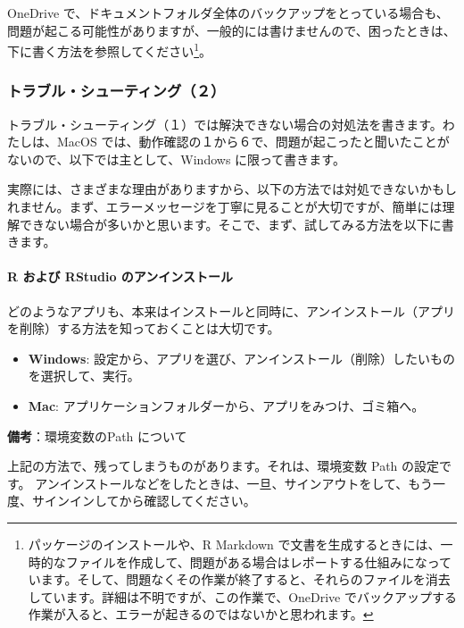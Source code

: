 \documentclass[
  xelatex, ja=standard]{bxjsbook}
\providecommand{\tightlist}{%
  \setlength{\itemsep}{0pt}\setlength{\parskip}{0pt}}
\theoremstyle{definition}
\theoremstyle{definition}
\theoremstyle{definition}
\theoremstyle{definition}
\theoremstyle{remark}
\begin{document}
OneDrive で、ドキュメントフォルダ全体のバックアップをとっている場合も、問題が起こる可能性がありますが、一般的には書けませんので、困ったときは、下に書く方法を参照してください\footnote{パッケージのインストールや、R Markdown で文書を生成するときには、一時的なファイルを作成して、問題がある場合はレポートする仕組みになっています。そして、問題なくその作業が終了すると、それらのファイルを消去しています。詳細は不明ですが、この作業で、OneDrive でバックアップする作業が入ると、エラーが起きるのではないかと思われます。}。

\hypertarget{ux30c8ux30e9ux30d6ux30ebux30b7ux30e5ux30fcux30c6ux30a3ux30f3ux30b0uxff12}{%
\subsubsection{トラブル・シューティング（２）}\label{ux30c8ux30e9ux30d6ux30ebux30b7ux30e5ux30fcux30c6ux30a3ux30f3ux30b0uxff12}}

トラブル・シューティング（１）では解決できない場合の対処法を書きます。わたしは、MacOS では、動作確認の１から６で、問題が起こったと聞いたことがないので、以下では主として、Windows に限って書きます。

実際には、さまざまな理由がありますから、以下の方法では対処できないかもしれません。まず、エラーメッセージを丁寧に見ることが大切ですが、簡単には理解できない場合が多いかと思います。そこで、まず、試してみる方法を以下に書きます。

\hypertarget{r-ux304aux3088ux3073-rstudio-ux306eux30a2ux30f3ux30a4ux30f3ux30b9ux30c8ux30fcux30eb}{%
\paragraph{R および RStudio のアンインストール}\label{r-ux304aux3088ux3073-rstudio-ux306eux30a2ux30f3ux30a4ux30f3ux30b9ux30c8ux30fcux30eb}}

どのようなアプリも、本来はインストールと同時に、アンインストール（アプリを削除）する方法を知っておくことは大切です。

\begin{itemize}
\tightlist
\item
  \textbf{Windows}: 設定から、アプリを選び、アンインストール（削除）したいものを選択して、実行。
\item
  \textbf{Mac}: アプリケーションフォルダーから、アプリをみつけ、ゴミ箱へ。
\end{itemize}

\textbf{備考}：環境変数のPath について

上記の方法で、残ってしまうものがあります。それは、環境変数 Path の設定です。 アンインストールなどをしたときは、一旦、サインアウトをして、もう一度、サインインしてから確認してください。
\end{document}
